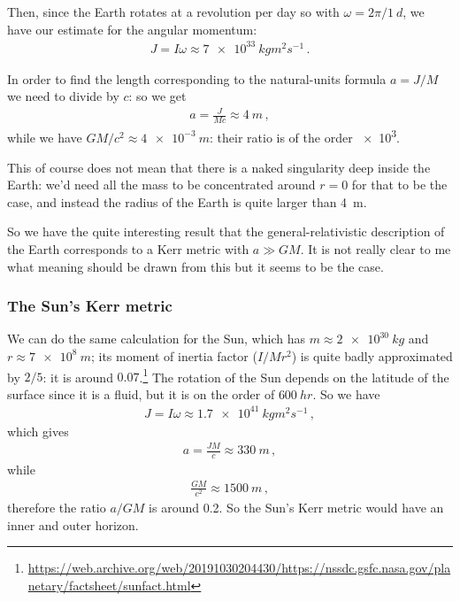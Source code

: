 \documentclass[main.tex]{subfiles}
\begin{document}
Then, since the Earth rotates at a revolution per day so with \(\omega = 2\pi / \SI{1}{d}\), we have our estimate for the angular momentum: 
%
\begin{align}
  J = I \omega 
  \approx \SI{7e+33}{kg m^2 s^{-1}}
\,.
\end{align}

In order to find the length corresponding to the natural-units formula \(a = J/M\) we need to divide by \(c\): so we get 
%
\begin{align}
  a = \frac{J}{Mc} \approx \SI{4}{m}
\,,
\end{align}
%
while we have \(GM/c^2 \approx \SI{4e-3}{m}\): their ratio is of the order \num{e3}.

This of course does not mean that there is a naked singularity deep inside the Earth: we'd need all the mass to be concentrated around \(r=0\) for that to be the case, and instead the radius of the Earth is quite larger than \SI{4}{m}.

So we have the quite interesting result that the general-relativistic description of the Earth corresponds to a Kerr metric with \(a \gg GM\). It is not really clear to me what meaning should be drawn from this but it seems to be the case. 

\subsubsection{The Sun's Kerr metric}

We can do the same calculation for the Sun, which has \(m \approx \SI{2e30}{kg}\) and \(r \approx \SI{7e8}{m}\); its moment of inertia factor (\(I  / Mr^2\)) is quite badly approximated by \(2/5\): it is around \(0.07\).\footnote{\url{https://web.archive.org/web/20191030204430/https://nssdc.gsfc.nasa.gov/planetary/factsheet/sunfact.html}}
The rotation of the Sun depends on the latitude of the surface since it is a fluid, but it is on the order of \(\SI{600}{hr}\). 
So we have 
%
\begin{align}
  J = I \omega \approx \SI{1.7e41}{kg m^2 s^{-1}}
\,,
\end{align}
%
which gives 
%
\begin{align}
  a = \frac{JM}{c} \approx \SI{330}{m}
\,,
\end{align}
%
while 
%
\begin{align}
  \frac{GM}{c^2} \approx \SI{1500}{m}
\,,
\end{align}
%
therefore the ratio \(a/GM\) is around \num{0.2}. 
So the Sun's Kerr metric would have an inner and outer horizon. 
\end{document}
